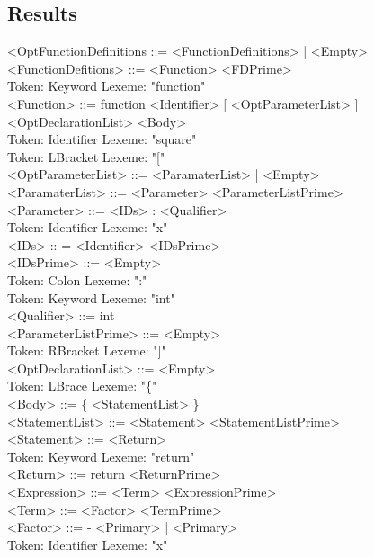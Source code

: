\documentclass[11pt]{article}
\begin{document}
\subsection*{Results}
\label{sec-2-1}
<OptFunctionDefinitions ::= <FunctionDefinitions> | <Empty> \\
        <FunctionDefitions> ::= <Function> <FDPrime> \\
Token: Keyword   Lexeme: "function" \\
        <Function> ::= function <Identifier> [ <OptParameterList> ]
<OptDeclarationList> <Body> \\
Token: Identifier        Lexeme: "square" \\
Token: LBracket          Lexeme: "[" \\
        <OptParameterList> ::= <ParamaterList> | <Empty> \\
        <ParamaterList> ::= <Parameter> <ParameterListPrime> \\
        <Parameter> ::= <IDs> : <Qualifier> \\
Token: Identifier        Lexeme: "x" \\
        <IDs> :: = <Identifier> <IDsPrime> \\
        <IDsPrime> ::= <Empty> \\
Token: Colon     Lexeme: ":" \\
Token: Keyword   Lexeme: "int" \\
        <Qualifier> ::= int \\
        <ParameterListPrime> ::= <Empty> \\
Token: RBracket          Lexeme: "]" \\
        <OptDeclarationList> ::= <Empty> \\
Token: LBrace    Lexeme: "\{" \\
        <Body> ::= \{ <StatementList> \} \\
        <StatementList> ::= <Statement> <StatementListPrime> \\
        <Statement> ::= <Return> \\
Token: Keyword   Lexeme: "return" \\
        <Return> ::= return <ReturnPrime> \\
        <Expression> ::= <Term> <ExpressionPrime> \\
        <Term> ::= <Factor> <TermPrime> \\
        <Factor> ::= - <Primary> | <Primary> \\
Token: Identifier        Lexeme: "x" \\
\end{document}
